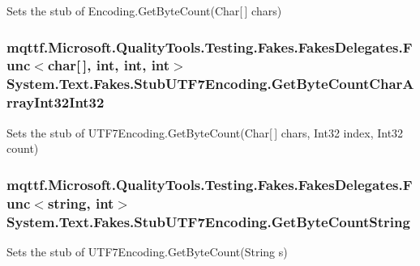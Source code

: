Sets the stub of Encoding.\-Get\-Byte\-Count(\-Char\mbox{[}$\,$\mbox{]} chars)

\hypertarget{class_system_1_1_text_1_1_fakes_1_1_stub_u_t_f7_encoding_a6145c580143722373fd009277bc8b16a}{
\subsubsection[{Get\-Byte\-Count\-Char\-Array\-Int32\-Int32}]{\setlength{\rightskip}{0pt plus 5cm}mqttf.\-Microsoft.\-Quality\-Tools.\-Testing.\-Fakes.\-Fakes\-Delegates.\-Func$<$char\mbox{[}$\,$\mbox{]}, int, int, int$>$ System.\-Text.\-Fakes.\-Stub\-U\-T\-F7\-Encoding.\-Get\-Byte\-Count\-Char\-Array\-Int32\-Int32}}\label{class_system_1_1_text_1_1_fakes_1_1_stub_u_t_f7_encoding_a6145c580143722373fd009277bc8b16a}


Sets the stub of U\-T\-F7\-Encoding.\-Get\-Byte\-Count(\-Char\mbox{[}$\,$\mbox{]} chars, Int32 index, Int32 count)

\hypertarget{class_system_1_1_text_1_1_fakes_1_1_stub_u_t_f7_encoding_a3b2e9d4acf3894283cd3ed348f789799}{
\subsubsection[{Get\-Byte\-Count\-String}]{\setlength{\rightskip}{0pt plus 5cm}mqttf.\-Microsoft.\-Quality\-Tools.\-Testing.\-Fakes.\-Fakes\-Delegates.\-Func$<$string, int$>$ System.\-Text.\-Fakes.\-Stub\-U\-T\-F7\-Encoding.\-Get\-Byte\-Count\-String}}\label{class_system_1_1_text_1_1_fakes_1_1_stub_u_t_f7_encoding_a3b2e9d4acf3894283cd3ed348f789799}


Sets the stub of U\-T\-F7\-Encoding.\-Get\-Byte\-Count(\-String s)

